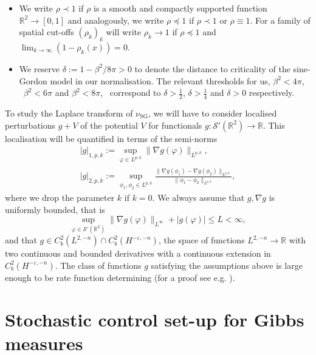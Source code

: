 \documentclass[11pt, a4paper]{scrartcl}
\numberwithin{equation}{section}
\theoremstyle{plain}
\theoremstyle{remark}
\newcommand{\assign}{:=}
\newcommand{\tmop}[1]{\ensuremath{\operatorname{#1}}}
\begin{document}
\begin{itemize}
	\item We write $\rho \prec 1$ if $\rho$ is a smooth and compactly supported
	      function $\mathbb{R}^2 \rightarrow [0, 1]$ and analogously, we write $\rho
		      \preceq 1$ if $\rho \prec 1$ or $\rho \equiv 1$. For a family of spatial
	      cut-offs $(\rho_k)_k$ will write $\rho_k \rightarrow 1$ if $\rho\preceq 1$ and
	      $\lim_{k\to\infty}(1-\rho_k(x))=0$.

	\item We reserve $\delta \assign 1 - \beta^2 / 8 \pi > 0$ to denote the
	      distance to criticality of the sine-Gordon model in our normalisation. The
	      relevant thresholds for us, $\beta^2 < 4 \pi$, \ $\beta^2 < 6 \pi$ and
	      $\beta^2 < 8 \pi$, \ correspond to $\delta > \frac{1}{2}$, $\delta >
		      \frac{1}{4}$ and $\delta > 0$ respectively.
\end{itemize}
To study the Laplace transform of $\nu_{\tmop{SG}}$, we will have to consider
localised perturbations $g + V$ of the potential $V$ for functionals $g :
	\mathcal{S}' (\mathbb{R}^2) \rightarrow \mathbb{R}$. This localisation will be
quantified in terms of the semi-norms
\[ \begin{aligned}
		| g |_{1, p, k} \assign \sup_{\varphi \in L^{p, k}} \| \nabla g (\varphi)
		\|_{L^{p, k}}, \\
		| g |_{2, p, k} \assign \sup_{\phi_1, \phi_2 \in L^{p, k}}  \frac{\|
			\nabla g (\phi_1) - \nabla g (\phi_2) \|_{L^{p, k}}}{\| \phi_1 - \phi_2
			\|_{L^{p, k}}},
	\end{aligned}\]
where we drop the parameter $k$ if $k = 0$. We always assume that $g, \nabla g$ is
uniformly bounded, that is
\[ \sup_{\varphi \in \mathcal{S}' (\mathbb{R}^2)} \| \nabla g (\varphi)
	\|_{L^{\infty}} + |g(\varphi)| \leqslant L < \infty, \]
and that $g \in C^2_b (L^{2, - n}) \cap C^2_b (H^{- \varepsilon, - n})$, the
space of functions $L^{2, - n} \rightarrow \mathbb{R}$ with two continuous and
bounded derivatives with a continuous extension in $C^2_b (H^{- \varepsilon, -
			n})$.
The class of functions $g$ satisfying the assumptions above is large enough to
be rate function determining (for a proof see e.g. {\cite[Lemma
			9]{barashkovStochasticControlApproach2022}}).

\section{ Stochastic control set-up for Gibbs measures}\label{sec:CP}
\end{document}
